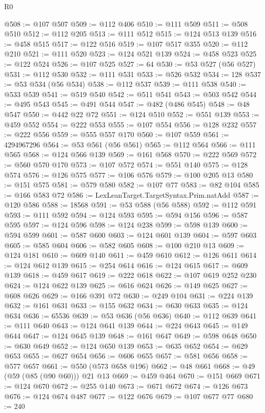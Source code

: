 \begin{lexlean}{R0}
\begin{coremodule}
@508 := @107 @507
@509 := @112 @406
@510 := @111 @509
@511 := @508 @510
@512 := @112 @205
@513 := @111 @512
@515 := @124 @513 @139
@516 := @458 @515
@517 := @122 @516
@519 := @107 @517 @355
@520 := @112 @210
@521 := @111 @520
@523 := @124 @521 @139
@524 := @458 @523
@525 := @122 @524
@526 := @107 @525
@527 := 64
@530 := @53 @527 (@56 @527)
@531 := @112 @530
@532 := @111 @531
@533 := @526 @532
@534 := 128
@537 := @53 @534 (@56 @534)
@538 := @112 @537
@539 := @111 @538
@540 := @533 @539
@541 := @519 @540
@542 := @511 @541
@543 := @503 @542
@544 := @495 @543
@545 := @491 @544
@547 := @482 (@486 @545)
@548 := @48 @547
@550 := @442 @22 @72
@551 := @124 @510
@552 := @551 @139
@553 := @459 @552
@554 := @222 @553
@555 := @107 @554
@556 := @128 @232
@557 := @222 @556
@559 := @555 @557 @170
@560 := @107 @559
@561 := 4294967296
@564 := @53 @561 (@56 @561)
@565 := @112 @564
@566 := @111 @565
@568 := @124 @566 @139
@569 := @161 @568
@570 := @222 @569
@572 := @560 @570 @170
@573 := @107 @572
@574 := @551 @140
@575 := @128 @574
@576 := @126 @575
@577 := @106 @576
@579 := @100 @205 @13
@580 := @151 @575
@581 := @579 @580
@582 := @107 @77
@583 := @82 @104
@585 := @166 @583 @72
@586 := LexLeanTarget.TargetSyntax.Prim.natAdd
@587 := @120 @586
@588 := 18568
@591 := @53 @588 (@56 @588)
@592 := @112 @591
@593 := @111 @592
@594 := @124 @593
@595 := @594 @156
@596 := @587 @595
@597 := @124 @596
@598 := @124 @238
@599 := @598 @139
@600 := @594 @599
@601 := @587 @600
@603 := @124 @601 @139
@604 := @597 @603
@605 := @585 @604
@606 := @582 @605
@608 := @100 @210 @13
@609 := @124 @181
@610 := @609 @140
@611 := @459 @610
@612 := @126 @611
@614 := @124 @612 @139
@615 := @254 @614
@616 := @124 @615
@617 := @609 @139
@618 := @459 @617
@619 := @222 @618
@622 := @107 @619 @252 @230
@624 := @124 @622 @139
@625 := @616 @624
@626 := @149 @625
@627 := @608 @626
@629 := @166 @391 @72
@630 := @249 @104
@631 := @224 @139
@632 := @161 @631
@633 := @155 @632
@634 := @630 @633
@635 := @124 @634
@636 := 65536
@639 := @53 @636 (@56 @636)
@640 := @112 @639
@641 := @111 @640
@643 := @124 @641 @139
@644 := @224 @643
@645 := @149 @644
@647 := @124 @645 @139
@648 := @161 @647
@649 := @598 @648
@650 := @630 @649
@652 := @124 @650 @139
@653 := @635 @652
@654 := @629 @653
@655 := @627 @654
@656 := @606 @655
@657 := @581 @656
@658 := @577 @657
@661 := @550 (@573 @658 @196)
@662 := @48 @661
@668 := @49 (@59 (@85 (@90 @60))) @21 @13
@669 := @459 @464
@670 := @151 @669
@671 := @124 @670
@672 := @255 @140
@673 := @671 @672
@674 := @126 @673
@676 := @124 @674 @487
@677 := @122 @676
@679 := @107 @677 @77
@680 := 240

\end{coremodule}
\end{lexlean}
